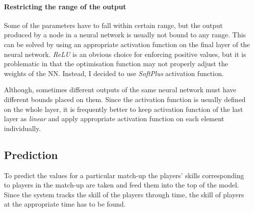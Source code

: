 \documentclass[12pt,a4paper]{book}
\begin{document}
\paragraph{Restricting the range of the output}
Some of the parameters have to fall within certain range, but the output produced by a node in a neural network is usually not bound to any range.
This can be solved by using an appropriate activation function on the final layer of the neural network.
\emph{ReLU} is an obvious choice for enforcing positive values, but it is problematic in that the optimisation function may not properly adjust the weights of the NN.
Instead, I decided to use \emph{SoftPlus} activation function.

Although, sometimes different outputs of the same neural network must have different bounds placed on them.
Since the activation function is usually defined on the whole layer, it is frequently better to keep activation function of the last layer as \emph{linear} and apply appropriate activation function on each element individually.

\subsection{Prediction}
To predict the values for a particular match-up the players' skills corresponding to players in the match-up are taken and feed them into the top of the model.
Since the system tracks the skill of the players through time, the skill of players at the appropriate time has to be found.
\end{document}
